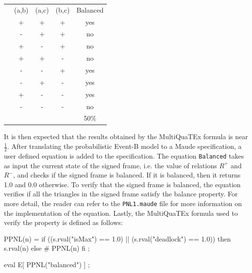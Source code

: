 \begin{table}[H]
\centering
        \begin{tabular}{lccc|c|}
        \cline{2-5}
        \multicolumn{1}{l|}{} & \multicolumn{1}{c|}{(a,b)} & \multicolumn{1}{c|}{(a,c)} & (b,c)                 & Balanced \\ \cline{2-5} 
        \multicolumn{1}{l|}{} & \multicolumn{1}{c|}{+}     & \multicolumn{1}{c|}{+}     & +                     & yes      \\ \cline{2-5} 
        \multicolumn{1}{l|}{} & \multicolumn{1}{c|}{-}     & \multicolumn{1}{c|}{+}     & +                     & no       \\ \cline{2-5} 
        \multicolumn{1}{l|}{} & \multicolumn{1}{c|}{+}     & \multicolumn{1}{c|}{-}     & +                     & no       \\ \cline{2-5} 
        \multicolumn{1}{l|}{} & \multicolumn{1}{c|}{+}     & \multicolumn{1}{c|}{+}     & -                     & no       \\ \cline{2-5} 
        \multicolumn{1}{l|}{} & \multicolumn{1}{c|}{-}     & \multicolumn{1}{c|}{-}     & +                     & yes      \\ \cline{2-5} 
        \multicolumn{1}{l|}{} & \multicolumn{1}{c|}{-}     & \multicolumn{1}{c|}{+}     & -                     & yes      \\ \cline{2-5} 
        \multicolumn{1}{l|}{} & \multicolumn{1}{c|}{+}     & \multicolumn{1}{c|}{-}     & -                     & yes      \\ \cline{2-5} 
        \multicolumn{1}{l|}{} & \multicolumn{1}{c|}{-}     & \multicolumn{1}{c|}{-}     & -                     & no       \\ \cline{2-5} 
                              & \multicolumn{1}{l}{}       & \multicolumn{1}{l}{}       & \multicolumn{1}{l|}{} & 50\%     \\ \cline{5-5} 
        \end{tabular}
        \end{table}
It is then expected that the results obtained by the MultiQuaTEx formula is near $\frac{1}{2}$. After translating the probabilistic Event-B model to a Maude specification, a user defined equation is added to the specification. The equation \texttt{Balanced} takes as input
the current state of the signed frame, i.e. the value of relations $R^+$ and $R^-$, and checks if the signed frame is balanced. If it is balanced, then it returns 1.0 and 0.0 otherwise. To verify that the signed frame is balanced, the equation verifies if all the triangles in the signed frame satisfy the balance property. For more detail, the reader can refer to the \texttt{PNL1.maude} file for more information on the implementation of the equation. Lastly, the MultiQuaTEx formula used to verify the property is defined as follows:
\begin{maude2}

PPNL(n) = if ((s.rval("isMax") == 1.0) || (s.rval("deadlock") == 1.0)) 
	     then s.rval(n) else # PPNL(n) fi ;

eval E[ PPNL("balanced") ] ; 
\end{maude2}

